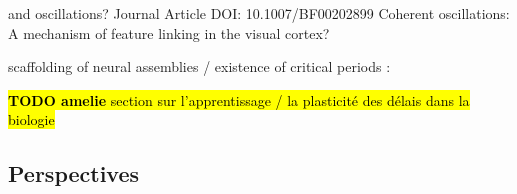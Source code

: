 \documentclass[brainsci, %
               review,submit,pdftex,moreauthors%
               ]{Definitions/mdpi}
\newcommand{\note}[1]{{\sethlcolor{yellow}\hl{#1}}}
\begin{document}
and oscillations? Journal Article DOI: 10.1007/BF00202899 Coherent oscillations: A mechanism of feature linking in the visual cortex?

scaffolding of neural assemblies / existence of critical periods :~\citep{dard_rapid_2021}



\note{\textbf{TODO amelie} section sur l'apprentissage / la plasticité des délais dans la biologie}


\subsection{Perspectives}


%
%
\end{document}
